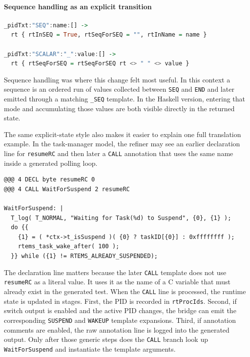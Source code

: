 \paragraph{Sequence handling as an explicit transition}
\begin{lstlisting}[language=Haskell, caption={Sequence state handled as an explicit transition}, label={lst:haskell-sequence-state}]
_pidTxt:"SEQ":name:[] ->
  rt { rtInSEQ = True, rtSeqForSEQ = "", rtInName = name }

_pidTxt:"SCALAR":"_":value:[] ->
  rt { rtSeqForSEQ = rtSeqForSEQ rt <> " " <> value }
\end{lstlisting}

Sequence handling was where this change felt most useful. In this
context a sequence is an ordered run of values collected between
\texttt{SEQ} and \texttt{END} and later emitted through a matching
\texttt{\_SEQ} template. In the Haskell version, entering that mode
and accumulating those values are both visible directly in the
returned state.

The same explicit-state style also makes it easier to explain one full
translation example. In the task-manager model, the refiner may see an
earlier declaration line for \texttt{resumeRC} and then later a
\texttt{CALL} annotation that uses the same name inside a generated
polling loop.

\begin{lstlisting}[caption={Annotation and refinement template used in the task-manager example}, label={lst:waitforsuspend-template}]
@@@ 4 DECL byte resumeRC 0
@@@ 4 CALL WaitForSuspend 2 resumeRC

WaitForSuspend: |
  T_log( T_NORMAL, "Waiting for Task(%d) to Suspend", {0}, {1} );
  do {{
    {1} = ( *ctx->t_isSuspend )( {0} ? taskID[{0}] : 0xffffffff );
    rtems_task_wake_after( 100 );
  }} while ({1} != RTEMS_ALREADY_SUSPENDED);
\end{lstlisting}

The declaration line matters because the later \texttt{CALL} template
does not use \texttt{resumeRC} as a literal value. It uses it as the
name of a C variable that must already exist in the generated test.
When the \texttt{CALL} line is processed, the runtime state is updated
in stages. First, the PID is recorded in \texttt{rtProcIds}. Second,
if switch output is enabled and the active PID changes, the bridge can
emit the corresponding \texttt{SUSPEND} and \texttt{WAKEUP} template
expansions. Third, if annotation comments are enabled, the raw
annotation line is logged into the generated output. Only after those
generic steps does the \texttt{CALL} branch look up
\texttt{WaitForSuspend} and instantiate the template arguments.

